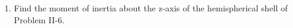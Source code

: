 \documentclass{article}
\begin{document}
\begin{enumerate}

    \item Find the moment of inertia about the z-axis of the hemispherical
    shell of Problem II-6.


\end{enumerate}
\end{document}
